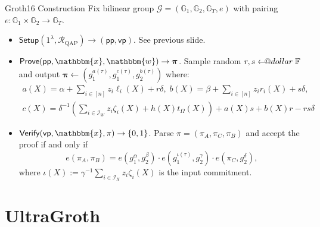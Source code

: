 \documentclass{zkdl-presentation-template}
\makeatletter
\newcommand\leftarrowS{\leftarrow\joinrel\smalldollar}
\newcommand{\smalldollar}{\mathrel{\mathpalette\small@dollar\relax}}
\newcommand{\small@dollar}[2]{%
  \vcenter{\hbox{%
    $#1\textnormal{\fontsize{0.7\dimexpr\f@size pt}{0}\selectfont\$}$%
  }}%
}
\makeatother
\begin{document}
    \begin{frame}{Groth16 Construction}
        Fix bilinear group $\mathcal{G} = (\mathbb{G}_1, \mathbb{G}_2,
        \mathbb{G}_T,e)$ with pairing $e: \mathbb{G}_1 \times \mathbb{G}_2 \to
        \mathbb{G}_T$.\pause

        \begin{itemize}
            \item $\textsf{Setup}(1^{\lambda},\mathcal{R}_{\text{QAP}}) \to (\textsf{pp},\textsf{vp})$. See previous slide.\pause
            \item $\textsf{Prove}(\textsf{pp},\mathbbm{x}, \mathbbm{w}) \to \boldsymbol{\pi}$. Sample random 
            $r,s \leftarrowS \mathbb{F}$ and output $\boldsymbol{\pi} \gets (g_1^{a(\tau)}, g_1^{c(\tau)}, g_2^{b(\tau)})$ where:
            \begin{gather*}
                a(X) = \alpha + \sum_{i \in [n]}z_i\ell_i(X) + r\delta, \; b(X) = \beta + \sum_{i \in [n]}z_ir_i(X) + s\delta, \\
                c(X) = \delta^{-1}\left(\sum_{i \in \mathcal{I}_W} z_i\zeta_i(X)+h(X)t_{\Omega}(X)\right) + a(X)s + b(X)r - rs\delta
            \end{gather*}
            \pause \item $\textsf{Verify}(\textsf{vp},\mathbbm{x},\pi) \to \{0,1\}$. Parse $\pi=(\pi_A,\pi_C,\pi_B)$ and 
            accept the proof if and only if
            \begin{equation*}
                e(\pi_A,\pi_B) = e(g_1^{\alpha},g_2^{\beta}) \cdot e(g_1^{\iota(\tau)}, g_2^{\gamma}) \cdot e(\pi_C, g_2^{\delta}),
            \end{equation*}
            where $\iota(X) := \gamma^{-1}\sum_{i \in
            \mathcal{I}_X}z_i\zeta_i(X)$ is the input commitment.
        \end{itemize}
    \end{frame}

    \section{UltraGroth}
\end{document}
